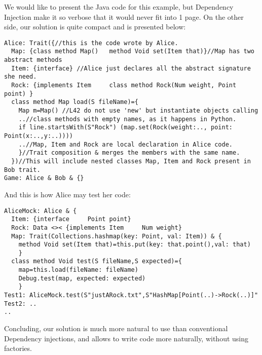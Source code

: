 \documentclass[a4paper,twoside,british,9pt]{extarticle}
\begin{document}
We would like to present the Java code for this example, but
Dependency Injection make it so verbose that it would
never fit into 1 page. On the other side, our solution 
is quite compact and is presented below:
\vspace{-1ex}
\begin{lstlisting}
Alice: Trait({//this is the code wrote by Alice.
  Map: {class method Map()   method Void set(Item that)}//Map has two abstract methods
  Item: {interface} //Alice just declares all the abstract signature she need.
  Rock: {implements Item     class method Rock(Num weight, Point point) }
  class method Map load(S fileName)={
    Map m=Map() //L42 do not use 'new' but instantiate objects calling
    ..//class methods with empty names, as it happens in Python.
    if line.startsWith(S"Rock") (map.set(Rock(weight:.., point: Point(x:..,y:..))))
    ..//Map, Item and Rock are local declaration in Alice code.
    }//Trait composition & merges the members with the same name.
  })//This will include nested classes Map, Item and Rock present in Bob trait.
Game: Alice & Bob & {}          
\end{lstlisting}

And this is how Alice may test her code:
\begin{lstlisting}
AliceMock: Alice & {
  Item: {interface     Point point}
  Rock: Data <>< {implements Item     Num weight}
  Map: Trait(Collections.hashmap(key: Point, val: Item)) & {
    method Void set(Item that)=this.put(key: that.point(),val: that)
    }
  class method Void test(S fileName,S expected)={
    map=this.load(fileName: fileName)
    Debug.test(map, expected: expected)
    }
Test1: AliceMock.test(S"justARock.txt",S"HashMap[Point(..)->Rock(..)]"
Test2: ..
..
\end{lstlisting}
\vspace{-1ex}
Concluding, our solution is much more natural to use than conventional Dependency injections,
and allows to write code more naturally, without using factories.
\end{document}
